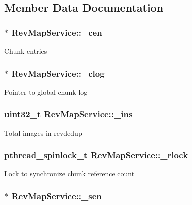 \subsection{\-Member \-Data \-Documentation}
\hypertarget{structRevMapService_a5af0b72f8ba84b926b568bc9c38d186a}{
\subsubsection[{\-\_\-cen}]{$\ast$ {\bf \-Rev\-Map\-Service\-::\-\_\-cen}}}\label{structRevMapService_a5af0b72f8ba84b926b568bc9c38d186a}
\-Chunk entries \hypertarget{structRevMapService_a6af1ae688052a7daca84586ffae50bc6}{
\subsubsection[{\-\_\-clog}]{$\ast$ {\bf \-Rev\-Map\-Service\-::\-\_\-clog}}}\label{structRevMapService_a6af1ae688052a7daca84586ffae50bc6}
\-Pointer to global chunk log \hypertarget{structRevMapService_ab0a99b750f57f7ac7b548b1f2729cea2}{
\subsubsection[{\-\_\-ins}]{\setlength{\rightskip}{0pt plus 5cm}uint32\-\_\-t {\bf \-Rev\-Map\-Service\-::\-\_\-ins}}}\label{structRevMapService_ab0a99b750f57f7ac7b548b1f2729cea2}
\-Total images in revdedup \hypertarget{structRevMapService_adfd1317c2bab22193cde446c3007d954}{
\subsubsection[{\-\_\-rlock}]{\setlength{\rightskip}{0pt plus 5cm}pthread\-\_\-spinlock\-\_\-t {\bf \-Rev\-Map\-Service\-::\-\_\-rlock}}}\label{structRevMapService_adfd1317c2bab22193cde446c3007d954}
\-Lock to synchronize chunk reference count \hypertarget{structRevMapService_ace492c5fabb9a24cc635bb89e45294e4}{
\subsubsection[{\-\_\-sen}]{$\ast$ {\bf \-Rev\-Map\-Service\-::\-\_\-sen}}}\label{structRevMapService_ace492c5fabb9a24cc635bb89e45294e4}
